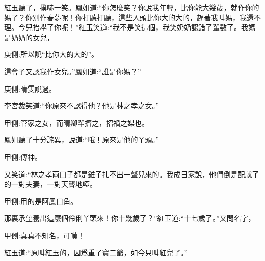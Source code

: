 \begin{parag}
    紅玉聽了，撲哧一笑。鳳姐道:“你怎麼笑？你說我年輕，比你能大幾歲，就作你的媽了？你別作春夢呢！你打聽打聽，這些人頭比你大的大的，趕著我叫媽，我還不理。今兒抬舉了你呢！”紅玉笑道:“我不是笑這個，我笑奶奶認錯了輩數了。我媽是奶奶的女兒，\begin{note}庚側:所以說“比你大的大的”。\end{note}這會子又認我作女兒。”鳳姐道:“誰是你媽？”\begin{note}庚側:晴雯說過。\end{note}李宮裁笑道:“你原來不認得他？他是林之孝之女。”\begin{note}甲側:管家之女，而晴卿輩擠之，招禍之媒也。\end{note}鳳姐聽了十分詫異，說道:“哦！原來是他的丫頭。”\begin{note}甲側:傳神。\end{note}又笑道:“林之孝兩口子都是錐子扎不出一聲兒來的。我成日家說，他們倒是配就了的一對夫妻，一對天聾地啞。\begin{note}甲側:用的是阿鳳口角。\end{note}那裏承望養出這麼個伶俐丫頭來！你十幾歲了？”紅玉道:“十七歲了。”又問名字，\begin{note}甲側:真真不知名，可嘆！\end{note}紅玉道:“原叫紅玉的，因爲重了寶二爺，如今只叫紅兒了。”
\end{parag}


